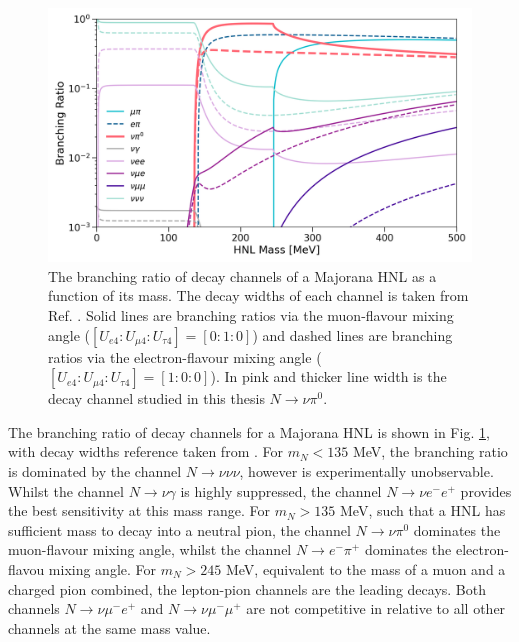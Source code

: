 \begin{figure}[htbp!] 
\centering    
\includegraphics[width=1.0\textwidth]{branching_ratio}
\caption[branching_ratio]{
The branching ratio of decay channels of a Majorana HNL as a function of its mass.
The decay widths of each channel is taken from Ref. \cite{}.
Solid lines are branching ratios via the muon-flavour mixing angle ($[U_{e4}:U_{\mu4}:U_{\tau4}]=[0:1:0]$) and dashed lines are branching ratios via the electron-flavour mixing angle ($[U_{e4}:U_{\mu4}:U_{\tau4}]=[1:0:0]$).
In pink and thicker line width is the decay channel studied in this thesis $N\rightarrow \nu \pi^{0}.$
}
\label{fig:branching_ratio}
\end{figure}

The branching ratio of decay channels for a Majorana HNL is shown in Fig. \ref{fig:branching_ratio}, with decay widths reference taken from \cite {}.
For $m_{N} < 135$ MeV, the branching ratio is dominated by the channel $N\rightarrow \nu\nu\nu$, however is experimentally unobservable.
Whilst the channel $N\rightarrow \nu \gamma$ is highly suppressed, the channel $N\rightarrow \nu e^{-}e^{+}$ provides the best sensitivity at this mass range.
For $m_{N} > 135$ MeV, such that a HNL has sufficient mass to decay into a neutral pion, the channel $N\rightarrow \nu \pi^{0}$ dominates the muon-flavour mixing angle, whilst the channel $N\rightarrow e^{-}\pi^{+}$ dominates the electron-flavou mixing angle.
For $m_{N} > 245$ MeV, equivalent to the mass of a muon and a charged pion combined, the lepton-pion channels are the leading decays. 
Both channels $N\rightarrow \nu \mu^{-}e^{+}$ and $N\rightarrow \nu \mu^{-}\mu^{+}$ are not competitive in relative to all other channels at the same mass value.  

